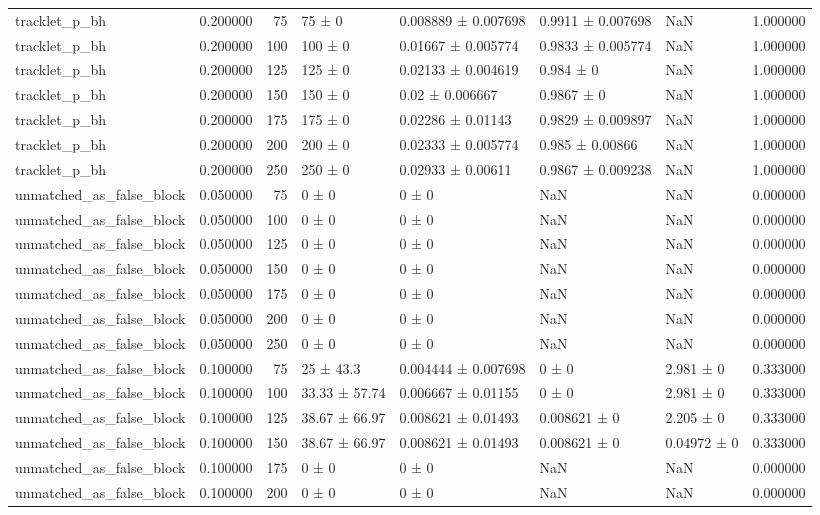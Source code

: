 \begin{tabular}{lrrllllr}
tracklet_p_bh & 0.200000 & 75 & 75 ± 0 & 0.008889 ± 0.007698 & 0.9911 ± 0.007698 & NaN & 1.000000 \\
tracklet_p_bh & 0.200000 & 100 & 100 ± 0 & 0.01667 ± 0.005774 & 0.9833 ± 0.005774 & NaN & 1.000000 \\
tracklet_p_bh & 0.200000 & 125 & 125 ± 0 & 0.02133 ± 0.004619 & 0.984 ± 0 & NaN & 1.000000 \\
tracklet_p_bh & 0.200000 & 150 & 150 ± 0 & 0.02 ± 0.006667 & 0.9867 ± 0 & NaN & 1.000000 \\
tracklet_p_bh & 0.200000 & 175 & 175 ± 0 & 0.02286 ± 0.01143 & 0.9829 ± 0.009897 & NaN & 1.000000 \\
tracklet_p_bh & 0.200000 & 200 & 200 ± 0 & 0.02333 ± 0.005774 & 0.985 ± 0.00866 & NaN & 1.000000 \\
tracklet_p_bh & 0.200000 & 250 & 250 ± 0 & 0.02933 ± 0.00611 & 0.9867 ± 0.009238 & NaN & 1.000000 \\
unmatched_as_false_block & 0.050000 & 75 & 0 ± 0 & 0 ± 0 & NaN & NaN & 0.000000 \\
unmatched_as_false_block & 0.050000 & 100 & 0 ± 0 & 0 ± 0 & NaN & NaN & 0.000000 \\
unmatched_as_false_block & 0.050000 & 125 & 0 ± 0 & 0 ± 0 & NaN & NaN & 0.000000 \\
unmatched_as_false_block & 0.050000 & 150 & 0 ± 0 & 0 ± 0 & NaN & NaN & 0.000000 \\
unmatched_as_false_block & 0.050000 & 175 & 0 ± 0 & 0 ± 0 & NaN & NaN & 0.000000 \\
unmatched_as_false_block & 0.050000 & 200 & 0 ± 0 & 0 ± 0 & NaN & NaN & 0.000000 \\
unmatched_as_false_block & 0.050000 & 250 & 0 ± 0 & 0 ± 0 & NaN & NaN & 0.000000 \\
unmatched_as_false_block & 0.100000 & 75 & 25 ± 43.3 & 0.004444 ± 0.007698 & 0 ± 0 & 2.981 ± 0 & 0.333000 \\
unmatched_as_false_block & 0.100000 & 100 & 33.33 ± 57.74 & 0.006667 ± 0.01155 & 0 ± 0 & 2.981 ± 0 & 0.333000 \\
unmatched_as_false_block & 0.100000 & 125 & 38.67 ± 66.97 & 0.008621 ± 0.01493 & 0.008621 ± 0 & 2.205 ± 0 & 0.333000 \\
unmatched_as_false_block & 0.100000 & 150 & 38.67 ± 66.97 & 0.008621 ± 0.01493 & 0.008621 ± 0 & 0.04972 ± 0 & 0.333000 \\
unmatched_as_false_block & 0.100000 & 175 & 0 ± 0 & 0 ± 0 & NaN & NaN & 0.000000 \\
unmatched_as_false_block & 0.100000 & 200 & 0 ± 0 & 0 ± 0 & NaN & NaN & 0.000000 \\

\end{tabular}
